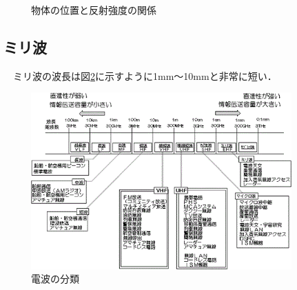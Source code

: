 \begin{figure}[H]
	\caption{物体の位置と反射強度の関係}
	\label{fig:RADAR_Demo}
\end{figure}


\subsection{ミリ波}
　ミリ波の波長は図\ref{fig:ClassificationOfRadioWaves}に示すように1mm～10mmと非常に短い．
\begin{figure}[H]
    \centering
    \includegraphics[width=10cm]{./fig/ClassificationOfRadioWaves.png}
    \caption{電波の分類\cite{soumu_RadioWaves}}
    \label{fig:ClassificationOfRadioWaves}
\end{figure}

